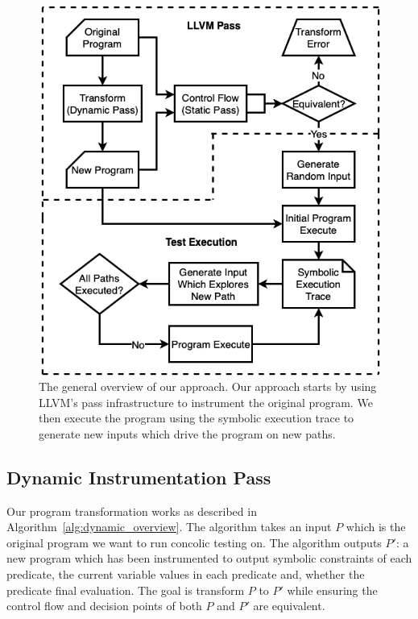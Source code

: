 \begin{figure}[t]
 \centering
 \includegraphics[width=\linewidth]{./images/overview.png}
 \caption{The general overview of our approach. Our approach starts by using LLVM's pass infrastructure to instrument the original program. We then execute the program using the symbolic execution trace to generate new inputs which drive the program on new paths.}
 \label{fig:attributes}
\end{figure}

\subsection{Dynamic Instrumentation Pass}
\label{sec:dynamic}

Our program transformation works as described in Algorithm~\ref{alg:dynamic_overview}. The algorithm takes an input $P$ which is the original program we want to run concolic testing on. The algorithm outputs $P'$: a new program which has been instrumented to output symbolic constraints of each predicate, the current variable values in each predicate and, whether the predicate final evaluation. The goal is transform $P$ to $P'$ while ensuring the control flow and decision points of both $P$ and $P'$ are equivalent.


